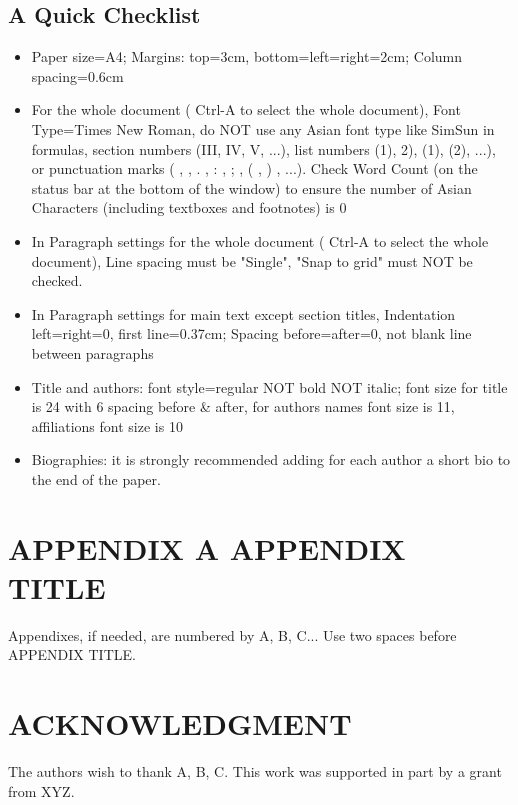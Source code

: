 \documentclass{article}
\begin{document}
\subsection{A Quick Checklist} 
\begin{itemize}
	\item Paper size=A4; Margins: top=3cm, bottom=left=right=2cm; Column spacing=0.6cm
	\item For the whole document ( Ctrl-A  to select the whole document), Font Type=Times New Roman, do NOT use any Asian font type like SimSun in formulas, section numbers (III, IV, V, ...), list numbers (1), 2), (1), (2), ...), or punctuation marks ( , ,  . ,  : ,  ; ,  ( ,  ) , ...). Check Word Count (on the status bar at the bottom of the window) to ensure the number of Asian Characters (including textboxes and footnotes) is 0
	\item 	In Paragraph settings for the whole document (  Ctrl-A  to select the whole document), Line spacing must be "Single", "Snap to grid" must NOT be checked. 
	\item In Paragraph settings for main text except section titles, Indentation left=right=0, first line=0.37cm; Spacing before=after=0, not blank line between paragraphs
	
	\item Title and authors: font style=regular NOT bold NOT italic; font size for title is 24 with 6 spacing before \& after, for authors names font size is 11, affiliations font size is 10
	
	\item Biographies: it is strongly recommended adding for each author a short bio to the end of the paper.
	
\end{itemize}


\section{APPENDIX A APPENDIX TITLE}
Appendixes, if needed, are numbered by A, B, C... Use two spaces before APPENDIX TITLE.


\section{ACKNOWLEDGMENT}
	The authors wish to thank A, B, C. This work was supported in part by a grant from XYZ.	

\end{document}
